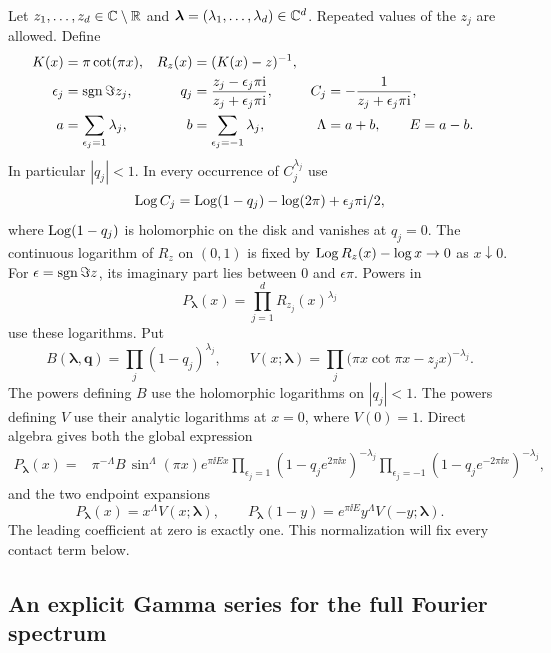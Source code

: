Let $z_1,\ldots,z_d\in\mathbb C\setminus\mathbb R$ and
$\boldsymbol\lambda=(\lambda_1,\ldots,\lambda_d)\in\mathbb C^d$. Repeated
values of the $z_j$ are allowed. Define
\begin{align}
 K(x)&=\pi\cot(\pi x),& R_z(x)&=(K(x)-z)^{-1},\notag\\
 \epsilon_j&=\operatorname{sgn}\Im z_j,&
 q_j&=\frac{z_j-\epsilon_j\pi\mathrm i}{z_j+\epsilon_j\pi\mathrm i},&
 C_j&=-\frac1{z_j+\epsilon_j\pi\mathrm i},\label{mr:diskdata}\\
 a&=\sum_{\epsilon_j=1}\lambda_j,&
 b&=\sum_{\epsilon_j=-1}\lambda_j,&
 \Lambda&=a+b,\qquad E=a-b.\notag
\end{align}
In particular $|q_j|<1$. In every occurrence of $C_j^{\lambda_j}$ use
\[
 \operatorname{Log} C_j=\operatorname{Log}(1-q_j)-\log(2\pi)+\epsilon_j\pi\mathrm i/2,
\]
where $\operatorname{Log}(1-q_j)$ is holomorphic on the disk and vanishes at $q_j=0$.
The continuous logarithm of $R_z$ on $(0,1)$
is fixed by $\operatorname{Log} R_z(x)-\log x\to0$ as $x\downarrow0$. For
$\epsilon=\operatorname{sgn}\Im z$, its imaginary part lies between $0$ and
$\epsilon\pi$. Powers in
\begin{equation}\label{mr:kernel}
 P_{\boldsymbol\lambda}(x)
       =\prod_{j=1}^d R_{z_j}(x)^{\lambda_j}
\end{equation}
use these logarithms. Put
\[
 B(\boldsymbol\lambda,\mathbf q)
       =\prod_j(1-q_j)^{\lambda_j},
 \qquad
 V(x;\boldsymbol\lambda)
       =\prod_j\bigl(\pi x\cot\pi x-z_jx\bigr)^{-\lambda_j}.
\]
The powers defining $B$ use the holomorphic logarithms on $|q_j|<1$.
The powers defining $V$ use their analytic logarithms at $x=0$, where
$V(0)=1$. Direct algebra gives both the global expression
\begin{align}
 P_{\boldsymbol\lambda}(x)
  ={}&\pi^{-\Lambda}B\,\sin^{\Lambda}(\pi x)e^{\pi\ii E x}
       \prod_{\epsilon_j=1}(1-q_je^{2\pi\ii x})^{-\lambda_j}
       \prod_{\epsilon_j=-1}(1-q_je^{-2\pi\ii x})^{-\lambda_j},
       \label{mr:sinefactor}
\end{align}
and the two endpoint expansions
\begin{equation}\label{mr:endpoints}
 P_{\boldsymbol\lambda}(x)=x^\Lambda V(x;\boldsymbol\lambda),\qquad
 P_{\boldsymbol\lambda}(1-y)
       =e^{\pi\ii E}y^\Lambda V(-y;\boldsymbol\lambda).
\end{equation}
The leading coefficient at zero is exactly one. This normalization
will fix every contact term below.

\subsection{An explicit Gamma series for the full Fourier spectrum}


